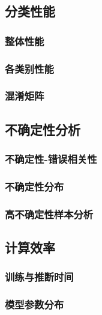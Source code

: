 \subsection{分类性能}

\subsubsection{整体性能}


\subsubsection{各类别性能}



\subsubsection{混淆矩阵}


\subsection{不确定性分析}

\subsubsection{不确定性-错误相关性}




\subsubsection{不确定性分布}


\subsubsection{高不确定性样本分析}



\subsection{计算效率}

\subsubsection{训练与推断时间}


\subsubsection{模型参数分布}

